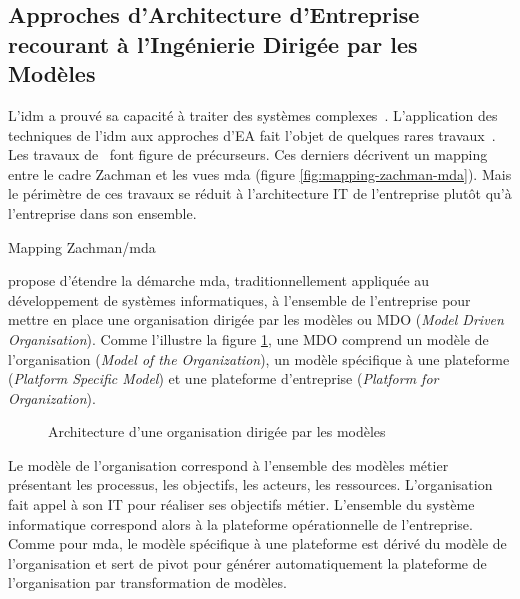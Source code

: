 \subsection{Approches d'Architecture d'Entreprise \\
recourant à l'Ingénierie Dirigée par les Modèles}
\label{sec:ea_with_idm}

L'\gls{idm} a prouvé sa capacité à traiter des systèmes complexes~\cite{france2007model}. L'application des techniques de l'\gls{idm} aux approches d'EA fait l'objet de quelques rares travaux~\cite{bruneliere2013support}. Les travaux de~\cite{frankel2003zachman} font figure de précurseurs. Ces derniers décrivent un mapping entre le cadre Zachman et les vues \gls{mda} (figure \ref{fig:mapping-zachman-mda}). Mais le périmètre de ces travaux se réduit à l'architecture IT de l'entreprise plutôt qu'à l'entreprise dans son ensemble.

\begin{table}[!ht]
    \vspace*{1em}
    \makebox[\linewidth][l]{%
      \hspace*{-5mm}%
    }
    \caption{Mapping Zachman/\gls{mda}~\protect\cite{frankel2003zachman}}
    \label{fig:mapping-zachman-mda}
\end{table}

\cite{clark_towards_2014} propose d'étendre la démarche \gls{mda},  traditionnellement appliquée au développement de systèmes informatiques, à l'ensemble de l'entreprise pour mettre en place une organisation dirigée par les modèles ou MDO (\textit{Model Driven Organisation}). Comme l'illustre la figure \ref{fig:mdo}, une MDO comprend un modèle de l'organisation (\textit{Model of the Organization}), un modèle spécifique à une plateforme (\textit{Platform Specific Model}) et une plateforme d'entreprise (\textit{Platform for Organization}). 

\begin{figure}[!ht]
    \begin{center}
        
    \end{center}
    \caption{Architecture d'une organisation dirigée par les modèles~\protect\cite{clark_towards_2014}}
    \label{fig:mdo}
\end{figure}

Le modèle de l'organisation correspond à l'ensemble des modèles métier présentant les processus, les objectifs, les acteurs, les ressources. L'organisation fait appel à son IT pour réaliser ses objectifs métier. L'ensemble du système informatique correspond alors à la plateforme opérationnelle de l'entreprise. Comme pour \gls{mda}, le modèle spécifique à une plateforme est dérivé du modèle de l'organisation et sert de pivot pour générer automatiquement la plateforme de l'organisation par transformation de modèles.

